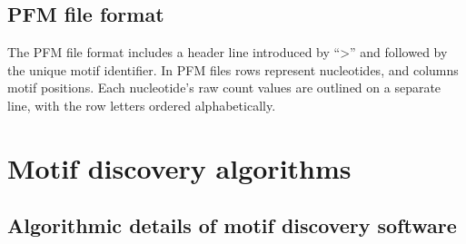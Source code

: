 \documentclass[a4paper, titlepage, openright]{book}
\begin{document}
\section{PFM file format}\label{section:pfm-format}
The PFM file format includes a header line introduced by ``>'' and followed by the unique motif identifier. In PFM files rows represent nucleotides, and columns motif positions. Each nucleotide's raw count values are outlined on a separate line, with the row letters ordered alphabetically.


\chapter{Motif discovery algorithms}\label{appendix:motifdiscovery}

\section{Algorithmic details of motif discovery software}\label{section:algorithms-motif-appendix}

\end{document}

